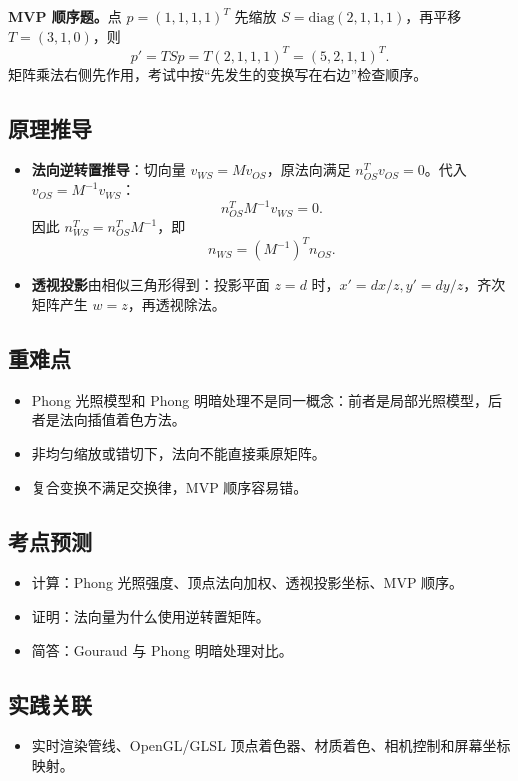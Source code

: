\documentclass[UTF8,zihao=-4,scheme=chinese,fontset=fandol]{ctexart}
\newcommand{\key}[1]{\textbf{#1}}
\begin{document}
\textbf{MVP 顺序题。}点 $p=(1,1,1,1)^T$ 先缩放 $S=\mathrm{diag}(2,1,1,1)$，再平移 $T=(3,1,0)$，则
\[
p'=TSp=T(2,1,1,1)^T=(5,2,1,1)^T.
\]
矩阵乘法右侧先作用，考试中按“先发生的变换写在右边”检查顺序。

\subsection{原理推导}
\begin{itemize}
  \item \key{法向逆转置推导}：切向量 $v_{WS}=Mv_{OS}$，原法向满足 $n_{OS}^Tv_{OS}=0$。代入 $v_{OS}=M^{-1}v_{WS}$：
  \[
  n_{OS}^TM^{-1}v_{WS}=0.
  \]
  因此 $n_{WS}^T=n_{OS}^TM^{-1}$，即
  \[
  n_{WS}=(M^{-1})^Tn_{OS}.
  \]
  \item \key{透视投影}由相似三角形得到：投影平面 $z=d$ 时，$x'=dx/z,y'=dy/z$，齐次矩阵产生 $w=z$，再透视除法。
\end{itemize}

\subsection{重难点}
\begin{itemize}
  \item Phong 光照模型和 Phong 明暗处理不是同一概念：前者是局部光照模型，后者是法向插值着色方法。
  \item 非均匀缩放或错切下，法向不能直接乘原矩阵。
  \item 复合变换不满足交换律，MVP 顺序容易错。
\end{itemize}

\subsection{考点预测}
\begin{itemize}
  \item 计算：Phong 光照强度、顶点法向加权、透视投影坐标、MVP 顺序。
  \item 证明：法向量为什么使用逆转置矩阵。
  \item 简答：Gouraud 与 Phong 明暗处理对比。
\end{itemize}

\subsection{实践关联}
\begin{itemize}
  \item 实时渲染管线、OpenGL/GLSL 顶点着色器、材质着色、相机控制和屏幕坐标映射。
\end{itemize}
\end{document}

